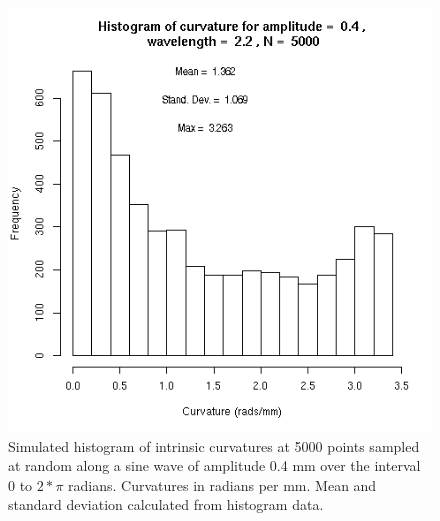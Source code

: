 %

\begin{figure}[!h]
  \centering
  \includegraphics[width=1.0\textwidth]{figcurvhist.png}
  \caption{Simulated histogram of intrinsic curvatures at 5000 points sampled at random along a sine wave of amplitude 0.4 mm over the interval 0 to $2 * \pi$ radians. Curvatures in radians per mm. Mean and standard deviation calculated from histogram data.}
  \label{fig:curvhist}
\end{figure}

%

